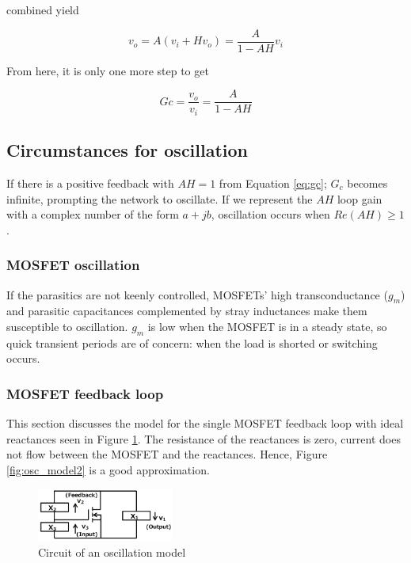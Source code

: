 combined yield

\begin{equation}
    v_o = A(v_i + Hv_o) = \frac{A}{1-AH}v_i
\end{equation}

From here, it is only one more step to get

\begin{equation}
    Gc = \frac{v_o}{v_i} = \frac{A}{1-AH}
    \label{eq:gc}
\end{equation}

\subsection{Circumstances for oscillation}
\label{sec:circumstances_for_osc}

If there is a positive feedback with $AH = 1$ from Equation \ref{eq:gc}; $G_c$ becomes infinite, prompting the network to oscillate. If we represent the $AH$ loop gain with a complex number of the form $a + jb$, oscillation occurs when $Re(AH) \geq 1$.

\subsubsection{MOSFET oscillation}
\label{sec:mosfet_osc}

If the parasitics are not keenly controlled, MOSFETs' high transconductance ($g_m$) and parasitic capacitances complemented by stray inductances make them susceptible to oscillation. $g_m$ is low when the MOSFET is in a steady state, so quick transient periods are of concern: when the load is shorted or switching occurs.

\subsubsection{MOSFET feedback loop}
\label{sec:mosfet_feedback_loop}

This section discusses the model for the single MOSFET feedback loop with ideal reactances seen in Figure \ref{fig:osc_model}. The resistance of the reactances is zero, current does not flow between the MOSFET and the reactances. Hence, Figure \ref{fig:osc_model2} is a good approximation.

\begin{figure}[H]
	\centering
	\includegraphics[width=0.4\textwidth]{pictures/theory/feedback_model.PNG}
	\caption{Circuit of an oscillation model}
	\label{fig:osc_model}
\end{figure}

